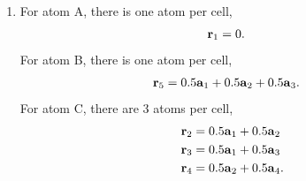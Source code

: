 \documentclass{homework}
\begin{document}
\begin{enumerate}
\begin{enumerate}
			\item For atom A, there is one atom per cell, \begin{align*}
				\boldsymbol{\mathrm{r}}_1 & = 0.
			\end{align*}
			For atom B, there is one atom per cell, \begin{align*}
				\boldsymbol{\mathrm{r}}_5 & = 0.5 \boldsymbol{\mathrm{a}}_1 + 0.5 \boldsymbol{\mathrm{a}}_2 + 0.5 \boldsymbol{\mathrm{a}}_3.
			\end{align*}
			For atom C, there are 3 atoms per cell, \begin{align*}
				\boldsymbol{\mathrm{r}}_2 & = 0.5 \boldsymbol{\mathrm{a}}_1 + 0.5 \boldsymbol{\mathrm{a}}_2 \\
				\boldsymbol{\mathrm{r}}_3 & = 0.5 \boldsymbol{\mathrm{a}}_1 + 0.5 \boldsymbol{\mathrm{a}}_3 \\
				\boldsymbol{\mathrm{r}}_4 & = 0.5 \boldsymbol{\mathrm{a}}_2 + 0.5 \boldsymbol{\mathrm{a}}_4.
			\end{align*}
		\end{enumerate}
	\end{enumerate}
\end{document}
